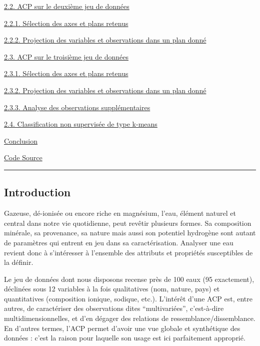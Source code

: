 \documentclass[]{article}
\begin{document}
\protect\hyperlink{acp-sur-le-deuxieme-jeu-de-donnees}{2.2. ACP sur le
deuxième jeu de données}

\protect\hyperlink{selection-des-axes-et-plans-retenus-1}{2.2.1.
Sélection des axes et plans retenus}

\protect\hyperlink{projection-des-variables-et-observations-dans-un-plan-donne-1}{2.2.2.
Projection des variables et observations dans un plan donné}

\protect\hyperlink{acp-sur-le-troisieme-jeu-de-donnees}{2.3. ACP sur le
troisième jeu de données}

\protect\hyperlink{selection-des-axes-et-plans-retenus-2}{2.3.1.
Sélection des axes et plans retenus}

\protect\hyperlink{projection-des-variables-et-observations-dans-un-plan-donne-2}{2.3.2.
Projection des variables et observations dans un plan donné}

\protect\hyperlink{analyse-des-observations-supplementaires-1}{2.3.3.
Analyse des observations supplémentaires}

\protect\hyperlink{classification-non-supervisee-de-type-k-means}{2.4.
Classification non supervisée de type k-means}

\protect\hyperlink{conclusion}{Conclusion}

\protect\hyperlink{code-source}{Code Source}

\begin{center}\rule{0.5\linewidth}{\linethickness}\end{center}

\hypertarget{introduction}{\subsection{Introduction}\label{introduction}}

Gazeuse, dé-ionisée ou encore riche en magnésium, l'eau, élément naturel
et central dans notre vie quotidienne, peut revêtir plusieurs formes. Sa
composition minérale, sa provenance, sa nature mais aussi son potentiel
hydrogène sont autant de paramètres qui entrent en jeu dans sa
caractérisation. Analyser une eau revient donc à s'intéresser à
l'ensemble des attributs et propriétés susceptibles de la définir.

Le jeu de données dont nous disposons recense près de 100 eaux (95
exactement), déclinées sous 12 variables à la fois qualitatives (nom,
nature, pays) et quantitatives (composition ionique, sodique, etc.).
L'intérêt d'une ACP est, entre autres, de caractériser des observations
dites ``multivariées'', c'est-à-dire multidimensionnelles, et d'en
dégager des relations de ressemblance/dissemblance. En d'autres termes,
l'ACP permet d'avoir une vue globale et synthétique des données : c'est
la raison pour laquelle son usage est ici parfaitement approprié.
\end{document}
